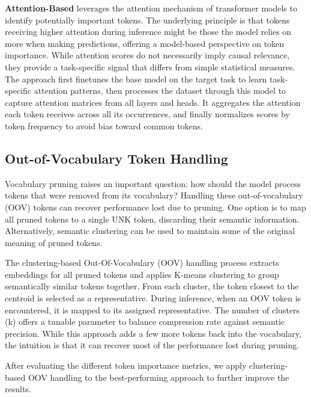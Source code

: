 \documentclass[twocolumn]{article}
\begin{document}
\textbf{Attention-Based}
leverages the attention mechanism of transformer models to identify potentially important tokens. The underlying principle is that tokens receiving higher attention during inference might be those the model relies on more when making predictions, offering a model-based perspective on token importance\cite{guo2024attention}. While attention scores do not necessarily imply causal relevance, they provide a task-specific signal that differs from simple statistical measures. The approach first finetunes the base model on the target task to learn task-specific attention patterns, then processes the dataset through this model to capture attention matrices from all layers and heads. It aggregates the attention each token receives across all its occurrences, and finally normalizes scores by token frequency to avoid bias toward common tokens.


\subsection{Out-of-Vocabulary Token Handling}
Vocabulary pruning raises an important question: how should the model process tokens that were removed from its vocabulary? Handling these out-of-vocabulary (OOV) tokens can recover performance lost due to pruning.
One option is to map all pruned tokens to a single UNK token, discarding their semantic information.
Alternatively, semantic clustering can be used to maintain some of the original meaning of pruned tokens.

The clustering-based Out-Of-Vocabulary (OOV) handling process extracts embeddings for all pruned tokens and applies K-means clustering to group semantically similar tokens together. From each cluster, the token closest to the centroid is selected as a representative. During inference, when an OOV token is encountered, it is mapped to its assigned representative.
The number of clusters (k) offers a tunable parameter to balance compression rate against semantic precision. While this approach adds a few more tokens back into the vocabulary, the intuition is that it can recover most of the performance lost during pruning.


After evaluating the different token importance metrics, we apply clustering-based OOV handling to the best-performing approach to further improve the results.
\end{document}
